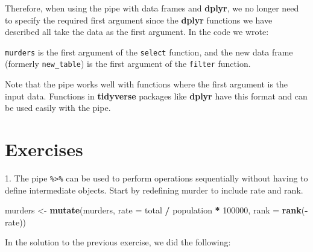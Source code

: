 \documentclass[
]{krantz}
\newenvironment{Shaded}{\begin{snugshade}}{\end{snugshade}}
\newcommand{\DataTypeTok}[1]{\textcolor[rgb]{0.27,0.27,0.27}{#1}}
\newcommand{\DecValTok}[1]{\textcolor[rgb]{0.06,0.06,0.06}{#1}}
\newcommand{\FloatTok}[1]{\textcolor[rgb]{0.06,0.06,0.06}{#1}}
\newcommand{\KeywordTok}[1]{\textcolor[rgb]{0.27,0.27,0.27}{\textbf{#1}}}
\newcommand{\NormalTok}[1]{#1}
\newcommand{\OperatorTok}[1]{\textcolor[rgb]{0.43,0.43,0.43}{\textbf{#1}}}
\newcommand{\StringTok}[1]{\textcolor[rgb]{0.5,0.5,0.5}{#1}}
\begin{document}
Therefore, when using the pipe with data frames and \textbf{dplyr}, we no longer need to specify the required first argument since the \textbf{dplyr} functions we have described all take the data as the first argument. In the code we wrote:

\begin{Shaded}
\end{Shaded}

\texttt{murders} is the first argument of the \texttt{select} function, and the new data frame (formerly \texttt{new\_table}) is the first argument of the \texttt{filter} function.

Note that the pipe works well with functions where the first argument is the input data. Functions in \textbf{tidyverse} packages like \textbf{dplyr} have this format and can be used easily with the pipe.

\hypertarget{exercises-10}{%
\section{Exercises}\label{exercises-10}}

1. The pipe \texttt{\%\textgreater{}\%} can be used to perform operations sequentially without having to define intermediate objects. Start by redefining murder to include rate and rank.

\begin{Shaded}
\begin{Highlighting}[]
\NormalTok{murders <-}\StringTok{ }\KeywordTok{mutate}\NormalTok{(murders, }\DataTypeTok{rate =}\NormalTok{  total }\OperatorTok{/}\StringTok{ }\NormalTok{population }\OperatorTok{*}\StringTok{ }\DecValTok{100000}\NormalTok{, }
                  \DataTypeTok{rank =} \KeywordTok{rank}\NormalTok{(}\OperatorTok{-}\NormalTok{rate))}
\end{Highlighting}
\end{Shaded}

In the solution to the previous exercise, we did the following:

\begin{Shaded}
\end{Shaded}
\end{document}
